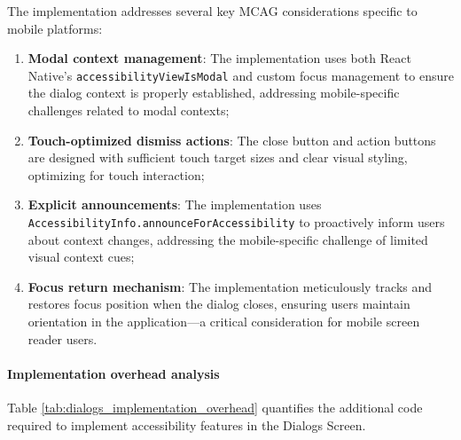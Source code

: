 The implementation addresses several key MCAG considerations specific to mobile platforms:
\begin{enumerate}
    \item \textbf{Modal context management}: The implementation uses both React Native's \texttt{accessibilityViewIsModal} and custom focus management to ensure the dialog context is properly established, addressing mobile-specific challenges related to modal contexts;
    
    \item \textbf{Touch-optimized dismiss actions}: The close button and action buttons are designed with sufficient touch target sizes and clear visual styling, optimizing for touch interaction;
    
    \item \textbf{Explicit announcements}: The implementation uses \texttt{AccessibilityInfo.announceForAccessibility} to proactively inform users about context changes, addressing the mobile-specific challenge of limited visual context cues;
    
    \item \textbf{Focus return mechanism}: The implementation meticulously tracks and restores focus position when the dialog closes, ensuring users maintain orientation in the application—a critical consideration for mobile screen reader users.
\end{enumerate}

\paragraph{Implementation overhead analysis}

Table \ref{tab:dialogs_implementation_overhead} quantifies the additional code required to implement accessibility features in the Dialogs Screen.

